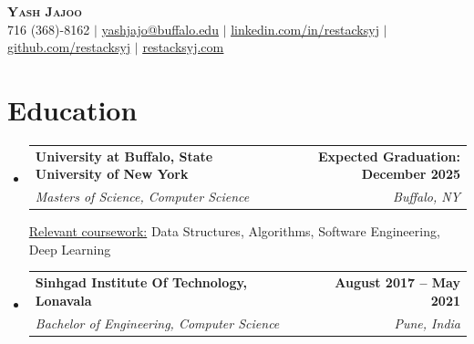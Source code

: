 \documentclass[letterpaper,11pt]{article}
\makeatletter
\newcommand{\resumeSubheading}[4]{
  \vspace{-2pt}\item
    \begin{tabular*}{0.97\textwidth}[t]{l@{\extracolsep{\fill}}r}
        \textbf{#1} & \textbf{#2} \\
      \textit{\small#3} & \textit{\small #4} \\
    \end{tabular*}\vspace{-7pt}
}
\newcommand{\resumeSubheadingTwo}[5]{
  \vspace{-2pt}\item
    \begin{tabular*}{0.97\textwidth}[t]{l@{\extracolsep{\fill}}r}
        \textbf{#1} & \textbf{#2} \\
      \textit{\small#3} & \textit{\small #4} \\
    \end{tabular*}
      {\small#5} 
}
\newcommand{\resumeSubHeadingListStart}{\begin{itemize}[leftmargin=0.15in, label={}]}
\newcommand{\resumeSubHeadingListEnd}{\end{itemize}}
\makeatother
\begin{document}

\begin{center}
    \textbf{\Huge \scshape Yash Jajoo} \\ \vspace{1pt}
    \small 716 (368)-8162 $|$ \href{mailto:yashjajo@buffalo.edu}{\underline{yashjajo@buffalo.edu}} $|$ 
    \color{blue}\href{https://linkedin.com/in/restacksyj}{\underline{linkedin.com/in/restacksyj}} $|$
    \href{https://github.com/restacksyj}{\underline{github.com/restacksyj}} $|$
    \href{https://restacksyj.com}{\underline{restacksyj.com}} 
\end{center}


\section{Education}
  \resumeSubHeadingListStart
    \resumeSubheadingTwo
      {University at Buffalo, State University of New York}{Expected Graduation: December 2025}
      {Masters of Science, Computer Science}{Buffalo, NY}
      {\underline{Relevant coursework:} Data Structures, Algorithms, Software Engineering, Deep Learning}
    \resumeSubheading
      {Sinhgad Institute Of Technology, Lonavala}{August 2017 -- May 2021}
      {Bachelor of Engineering, Computer Science}{Pune, India}
  \resumeSubHeadingListEnd


\end{document}
